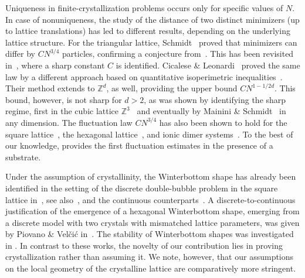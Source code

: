 \documentclass[reqno]{amsart}
\theoremstyle{plain}
\theoremstyle{definition}
\numberwithin{equation}{section}
\newcommand{\Z}{\mathbb{Z}}
\begin{document}
Uniqueness in finite-crystallization problems occurs only for
specific values of $N$. In case of nonuniqueness, the study of the
distance of two distinct minimizers (up to lattice translations) has
led to different results, depending on the underlying lattice
structure. For the triangular lattice,  {\sc
  Schmidt}~\cite{Schmidt-disk} proved  that minimizers can differ
by $CN^{3/4}$ particles, confirming a conjecture from~\cite{Yuen}. This has been revisited in~\cite{Davoli16},
where a sharp constant $C$ is identified.  {\sc Cicalese \&
  Leonardi}~\cite{cicalese} proved the same law by a different approach based
on quantitative isoperimetric inequalities~\cite{Bollobas,Figalli-Maggi-Pratelli,maggi2012sets}. Their method extends to $\Z^d$, as well,
providing the upper bound $CN^{1-1/2d}$. This bound, however, is not
sharp for $d>2$, as was shown by identifying the sharp regime, first in the cubic lattice $\Z^3$~\cite{Mainini-Piovano-schmidt} and eventually  by  {\sc Mainini \& Schmidt}~\cite{edo-bernd}   in any dimension.  The fluctuation law $CN^{3/4}$ has also been shown to hold for the square lattice~\cite{Mainini-Piovano}, the hexagonal lattice~\cite{Davoli15}, and ionic dimer systems~\cite{FriedrichKreutzHexagonal,FriedrichKreutzSquare}.  To the best of our knowledge,  provides the
first fluctuation estimates in the presence of a substrate.

Under the assumption of crystallinity, the  Winterbottom shape has  already been
identified in the setting of the discrete double-bubble problem in the
square lattice in~\cite{gorny}, see also~\cite{Duncan}, and the
continuous counterparts~\cite{Duncan0,Gorny2,Gorny3}. A
discrete-to-continuous justification of the emergence of a hexagonal Winterbottom shape, emerging from a discrete model with two crystals with mismatched lattice parameters, was given by {\sc Piovano \& Vel\v ci\' c} in~\cite{Piovano1,Piovano2}.
The stability of Winterbottom shapes was investigated in
\cite{Kholmatov, Kotecky,Kreutz}.  In contrast to these works, the novelty of our
contribution lies in proving crystallization rather than assuming
it.   We note, however, that our assumptions on the local geometry of
the crystalline lattice are comparatively more stringent.  

  
\end{document}
